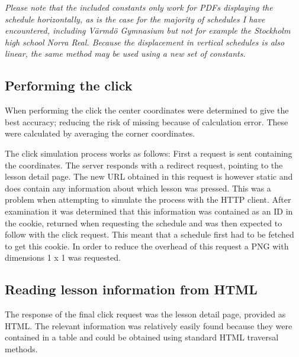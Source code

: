 \documentclass{article}
\begin{document}
	\textit{Please note that the included constants only work for PDFs displaying the schedule horizontally, as is the case for the majority of schedules I have encountered, including Värmdö Gymnasium but not for example the Stockholm high school Norra Real. Because the displacement in vertical schedules is also linear, the same method may be used using a new set of constants.}
	
	\subsection{Performing the click}
	When performing the click the center coordinates were determined to give the best accuracy; reducing the risk of missing because of calculation error. These were calculated by averaging the corner coordinates.
	
	The click simulation process works as follows: First a request is sent containing the coordinates. The server responds with a redirect request, pointing to the lesson detail page. The new URL obtained in this request is however static and does contain any information about which lesson was pressed. This was a problem when attempting to simulate the process with the HTTP client. After examination it was determined that this information was contained as an ID in the cookie, returned when requesting the schedule and was then expected to follow with the click request. This meant that a schedule first had to be fetched to get this cookie. In order to reduce the overhead of this request a PNG with dimensions 1 x 1 was requested.
	
	\subsection{Reading lesson information from HTML}
	The response of the final click request was the lesson detail page, provided as HTML. The relevant information was relatively easily found because they were contained in a table and could be obtained using standard HTML traversal methods.
	
\end{document}
